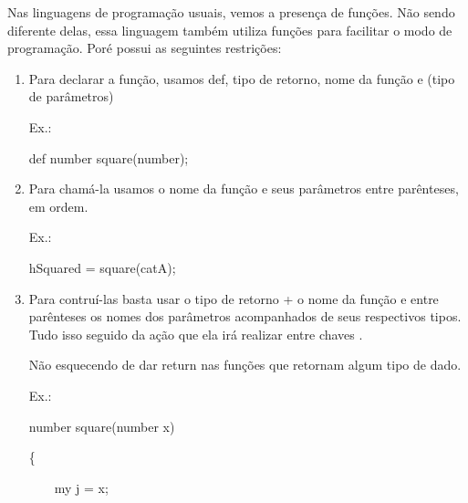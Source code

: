 \documentclass[a4paper]{article}
\begin{document}
{{{{{\begin{itemize}
            Nas linguagens de programação usuais, vemos a
            presença de funções.
            Não sendo diferente delas, essa linguagem também
            utiliza funções para facilitar o modo de programação.
            Poré possui as seguintes restrições:
                       
            \begin{enumerate}
                
                \item Para declarar a função, usamos 
           	        \textcolor{NavyBlue}{def}, tipo de retorno, nome
            	    da função e (tipo de parâmetros)
            	
                	\textcolor{NavyBlue}{Ex.:}
                	
                	\textcolor{NavyBlue}{def}
                	number square(number);
                	
            	\bigskip

                \item Para chamá-la usamos
                    o nome da função e seus parâmetros entre 
                    parênteses, em ordem.
                    
                    \textcolor{NavyBlue}{Ex.:}
                    
                    hSquared = square(catA);
                
                \bigskip
                
                \item Para contruí-las basta usar  o tipo
                    de retorno + o nome da função e entre
                    parênteses os nomes dos parâmetros acompanhados de 
                    seus respectivos tipos. Tudo isso seguido da ação que
                    ela irá realizar entre chaves {}.
                    
                    Não esquecendo de dar
                    \textcolor{NavyBlue}{return}
                    nas funções que retornam algum tipo de dado.
                    
                    \textcolor{NavyBlue}{Ex.:}
                    
                        number square(number x)
                        
                        \{
                        
                        \ \ \ \ my j = x;
                        

\end{enumerate}
\end{itemize}}}}}}
\end{document}
